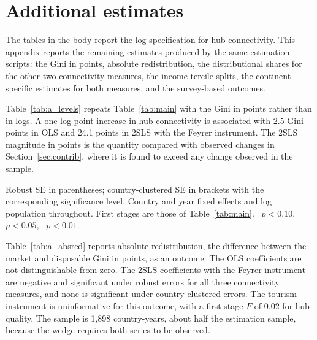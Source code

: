 
\appendix
\section{Additional estimates}
\label{app:additional}
The tables in the body report the log specification for hub connectivity. This appendix reports the remaining estimates produced by the same estimation scripts: the Gini in points, absolute redistribution, the distributional shares for the other two connectivity measures, the income-tercile splits, the continent-specific estimates for both measures, and the survey-based outcomes.

Table~\ref{tab:a_levels} repeats Table~\ref{tab:main} with the Gini in points rather than in logs. A one-log-point increase in hub connectivity is associated with 2.5 Gini points in OLS and 24.1 points in 2SLS with the Feyrer instrument. The 2SLS magnitude in points is the quantity compared with observed changes in Section~\ref{sec:contrib}, where it is found to exceed any change observed in the sample.

\begin{table}[H]\centering\caption{Main results with the Gini measured in points.}\label{tab:a_levels}
\begin{threeparttable}\small
\begin{tablenotes}\footnotesize\item Robust SE in parentheses; country-clustered SE in brackets with the corresponding significance level. Country and year fixed effects and log population throughout. First stages are those of Table~\ref{tab:main}. \sym{*}~$p<0.10$, \sym{**}~$p<0.05$, \sym{***}~$p<0.01$.\end{tablenotes}\end{threeparttable}\end{table}

Table~\ref{tab:a_absred} reports absolute redistribution, the difference between the market and disposable Gini in points, as an outcome. The OLS coefficients are not distinguishable from zero. The 2SLS coefficients with the Feyrer instrument are negative and significant under robust errors for all three connectivity measures, and none is significant under country-clustered errors. The tourism instrument is uninformative for this outcome, with a first-stage $F$ of $0.02$ for hub quality. The sample is 1,898 country-years, about half the estimation sample, because the wedge requires both series to be observed.

